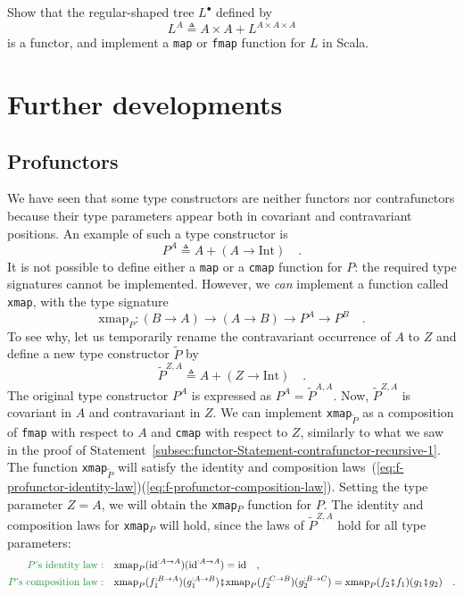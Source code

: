 Show that the regular-shaped tree $L^{\bullet}$ defined by
\[
L^{A}\triangleq A\times A+L^{A\times A\times A}
\]
is a functor, and implement a \lstinline!map! or \lstinline!fmap!
function for $L$ in Scala.

\section{Further developments}

\subsection{Profunctors\label{subsec:f-Profunctors}}

We have seen that some type constructors are neither functors nor
contrafunctors because their type parameters appear both in covariant
and contravariant positions. An example of such a type constructor
is
\[
P^{A}\triangleq A+\left(A\rightarrow\text{Int}\right)\quad.
\]
It is not possible to define either a \lstinline!map! or a \lstinline!cmap!
function for $P$: the required type signatures cannot be implemented.
However, we \emph{can} implement a function called \lstinline!xmap!,
with the type signature
\[
\text{xmap}_{P}:\left(B\rightarrow A\right)\rightarrow\left(A\rightarrow B\right)\rightarrow P^{A}\rightarrow P^{B}\quad.
\]
To see why, let us temporarily rename the contravariant occurrence
of $A$ to $Z$ and define a new type constructor $\tilde{P}$ by
\[
\tilde{P}^{Z,A}\triangleq A+\left(Z\rightarrow\text{Int}\right)\quad.
\]
The original type constructor $P^{A}$ is expressed as $P^{A}=\tilde{P}^{A,A}$.
Now, $\tilde{P}^{Z,A}$ is covariant in $A$ and contravariant in
$Z$. We can implement \lstinline!xmap!$_{\tilde{P}}$ as a composition
of \lstinline!fmap! with respect to $A$ and \lstinline!cmap! with
respect to $Z$, similarly to what we saw in the proof of Statement~\ref{subsec:functor-Statement-contrafunctor-recursive-1}.
The function \lstinline!xmap!$_{\tilde{P}}$ will satisfy the identity
and composition laws~(\ref{eq:f-profunctor-identity-law})\textendash (\ref{eq:f-profunctor-composition-law}).
Setting the type parameter $Z=A$, we will obtain the \lstinline!xmap!$_{P}$
function for $P$. The identity and composition laws for \lstinline!xmap!$_{P}$
will hold, since the laws of $\tilde{P}^{Z,A}$ hold for all type
parameters:
\begin{align*}
{\color{greenunder}P\text{\textsf{'}s identity law}:}\quad & \text{xmap}_{P}(\text{id}^{:A\rightarrow A})(\text{id}^{:A\rightarrow A})=\text{id}\quad,\\
{\color{greenunder}P\text{\textsf{'}s composition law}:}\quad & \text{xmap}_{P}(f_{1}^{:B\rightarrow A})(g_{1}^{:A\rightarrow B})\bef\text{xmap}_{P}(f_{2}^{:C\rightarrow B})(g_{2}^{:B\rightarrow C})=\text{xmap}_{P}(f_{2}\bef f_{1})(g_{1}\bef g_{2})\quad.
\end{align*}

